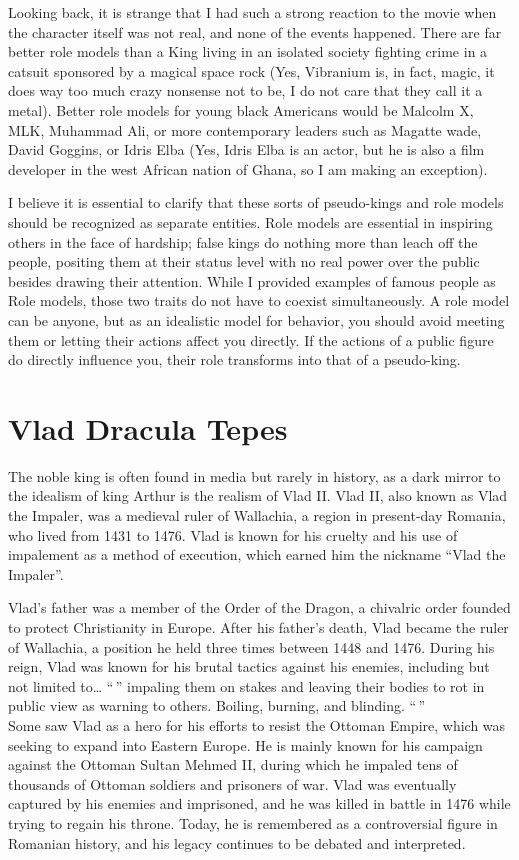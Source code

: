 \documentclass[
]{article}
\begin{document}
Looking back, it is strange that I had such a strong reaction to the
movie when the character itself was not real, and none of the events
happened. There are far better role models than a King living in an
isolated society fighting crime in a catsuit sponsored by a magical
space rock (Yes, Vibranium is, in fact, magic, it does way too much
crazy nonsense not to be, I do not care that they call it a metal).
Better role models for young black Americans would be Malcolm X, MLK,
Muhammad Ali, or more contemporary leaders such as Magatte wade, David
Goggins, or Idris Elba (Yes, Idris Elba is an actor, but he is also a
film developer in the west African nation of Ghana, so I am making an
exception).

I believe it is essential to clarify that these sorts of pseudo-kings
and role models should be recognized as separate entities. Role models
are essential in inspiring others in the face of hardship; false kings
do nothing more than leach off the people, positing them at their status
level with no real power over the public besides drawing their
attention. While I provided examples of famous people as Role models,
those two traits do not have to coexist simultaneously. A role model can
be anyone, but as an idealistic model for behavior, you should avoid
meeting them or letting their actions affect you directly. If the
actions of a public figure do directly influence you, their role
transforms into that of a pseudo-king.

\hypertarget{vlad-dracula-tepes}{%
\section{Vlad Dracula Tepes}\label{vlad-dracula-tepes}}

The noble king is often found in media but rarely in history, as a dark
mirror to the idealism of king Arthur is the realism of Vlad II. Vlad
II, also known as Vlad the Impaler, was a medieval ruler of Wallachia, a
region in present-day Romania, who lived from 1431 to 1476. Vlad is
known for his cruelty and his use of impalement as a method of
execution, which earned him the nickname ``Vlad the Impaler''.

Vlad's father was a member of the Order of the Dragon, a chivalric order
founded to protect Christianity in Europe. After his father's death,
Vlad became the ruler of Wallachia, a position he held three times
between 1448 and 1476. During his reign, Vlad was known for his brutal
tactics against his enemies, including but not limited to\ldots{} ``\,''
impaling them on stakes and leaving their bodies to rot in public view
as warning to others. Boiling, burning, and blinding. ``\,''\\
Some saw Vlad as a hero for his efforts to resist the Ottoman Empire,
which was seeking to expand into Eastern Europe. He is mainly known for
his campaign against the Ottoman Sultan Mehmed II, during which he
impaled tens of thousands of Ottoman soldiers and prisoners of war. Vlad
was eventually captured by his enemies and imprisoned, and he was killed
in battle in 1476 while trying to regain his throne. Today, he is
remembered as a controversial figure in Romanian history, and his legacy
continues to be debated and interpreted.
\end{document}
